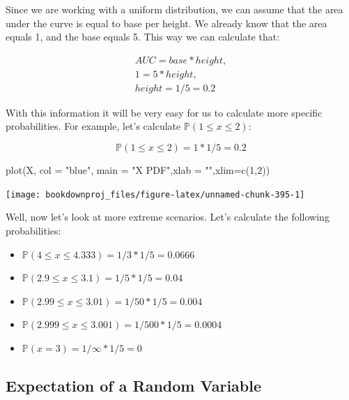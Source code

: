 \documentclass[
]{book}
\newenvironment{Shaded}{\begin{snugshade}}{\end{snugshade}}
\newcommand{\AttributeTok}[1]{\textcolor[rgb]{0.77,0.63,0.00}{#1}}
\newcommand{\DecValTok}[1]{\textcolor[rgb]{0.00,0.00,0.81}{#1}}
\newcommand{\FunctionTok}[1]{\textcolor[rgb]{0.00,0.00,0.00}{#1}}
\newcommand{\NormalTok}[1]{#1}
\newcommand{\StringTok}[1]{\textcolor[rgb]{0.31,0.60,0.02}{#1}}
\providecommand{\tightlist}{%
  \setlength{\itemsep}{0pt}\setlength{\parskip}{0pt}}
\theoremstyle{definition}
\theoremstyle{definition}
\theoremstyle{definition}
\theoremstyle{definition}
\theoremstyle{remark}
\begin{document}
Since we are working with a uniform distribution, we can assume that the area under the curve is equal to base per height. We already know that the area equals 1, and the base equals 5. This way we can calculate that:

\begin{align}
AUC = base*height, \\
1 = 5*height, \\
height = 1/5 = 0.2
\end{align}

With this information it will be very easy for us to calculate more specific probabilities. For example, let's calculate \(\mathbb{P}(1 \leq x \leq 2)\):

\[
\mathbb{P}(1 \leq x \leq 2) = 1*1/5 = 0.2
\]

\begin{Shaded}
\begin{Highlighting}[]
\FunctionTok{plot}\NormalTok{(X, }\AttributeTok{col =} \StringTok{"blue"}\NormalTok{, }\AttributeTok{main =} \StringTok{"X PDF"}\NormalTok{,}\AttributeTok{xlab =} \StringTok{""}\NormalTok{,}\AttributeTok{xlim=}\FunctionTok{c}\NormalTok{(}\DecValTok{1}\NormalTok{,}\DecValTok{2}\NormalTok{))}
\end{Highlighting}
\end{Shaded}

\begin{center}\texttt{[image: bookdownproj\_files/figure-latex/unnamed-chunk-395-1]} \end{center}

Well, now let's look at more extreme scenarios. Let's calculate the following probabilities:

\begin{itemize}
\tightlist
\item
  \(\mathbb{P}(4 \leq x \leq 4.333) = 1/3 * 1/5 = 0.0666\)
\item
  \(\mathbb{P}(2.9 \leq x \leq 3.1) = 1/5 * 1/5 = 0.04\)
\item
  \(\mathbb{P}(2.99 \leq x \leq 3.01) = 1/50 * 1/5 = 0.004\)
\item
  \(\mathbb{P}(2.999 \leq x \leq 3.001) = 1/500 * 1/5 = 0.0004\)
\item
  \(\mathbb{P}(x=3) = 1/\infty * 1/5 = 0\)
\end{itemize}

\hypertarget{expectation-of-a-random-variable}{%
\subsection{Expectation of a Random Variable}\label{expectation-of-a-random-variable}}
\end{document}
